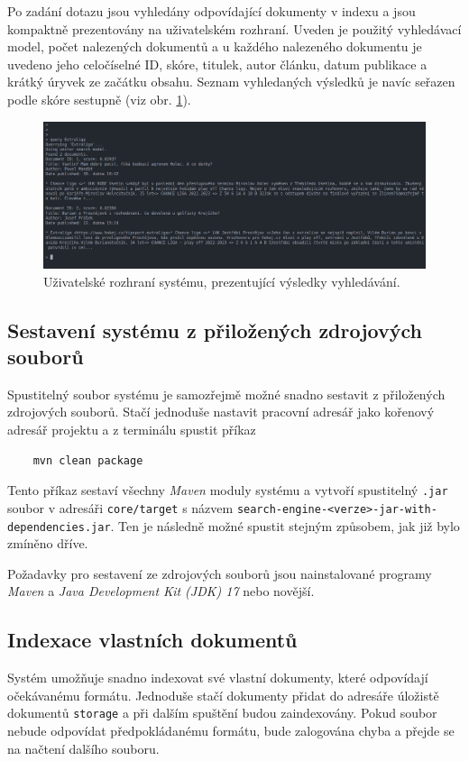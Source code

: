\documentclass{article}
\begin{document}
Po zadání dotazu jsou vyhledány odpovídající dokumenty v indexu a jsou kompaktně prezentovány na uživatelském rozhraní. Uveden je použitý vyhledávací model, počet nalezených dokumentů a u každého nalezeného dokumentu je uvedeno jeho celočíselné ID, skóre, titulek, autor článku, datum publikace a krátký úryvek ze začátku obsahu. Seznam vyhledaných výsledků je navíc seřazen podle skóre sestupně (viz obr. \ref{fig:ui}).

\begin{figure}[!h]
    \centering
    \includegraphics[width=\columnwidth]{img/UI.png}
    \caption{Uživatelské rozhraní systému, prezentující výsledky vyhledávání.}
    \label{fig:ui}
\end{figure}

\newpage
\subsection{Sestavení systému z přiložených zdrojových souborů}
Spustitelný soubor systému je samozřejmě možné snadno sestavit z přiložených zdrojových souborů. Stačí jednoduše nastavit pracovní adresář jako kořenový adresář projektu a z terminálu spustit příkaz 

\begin{verbatim}
    mvn clean package
\end{verbatim}

Tento příkaz sestaví všechny \textit{Maven} moduly systému a vytvoří spustitelný \texttt{.jar} soubor v adresáři \texttt{core/target} s názvem \newline \texttt{search-engine-<verze>-jar-with-dependencies.jar}. Ten je následně možné spustit stejným způsobem, jak již bylo zmíněno dříve.

Požadavky pro sestavení ze zdrojových souborů jsou nainstalované programy \textit{Maven} a \textit{Java Development Kit (JDK) 17} nebo novější.

\subsection{Indexace vlastních dokumentů}
Systém umožňuje snadno indexovat své vlastní dokumenty, které odpovídají očekávanému formátu. Jednoduše stačí dokumenty přidat do adresáře úložistě dokumentů \texttt{storage} a při dalším spuštění budou zaindexovány. Pokud soubor nebude odpovídat předpokládanému formátu, bude zalogována chyba a přejde se na načtení dalšího souboru.
\end{document}
